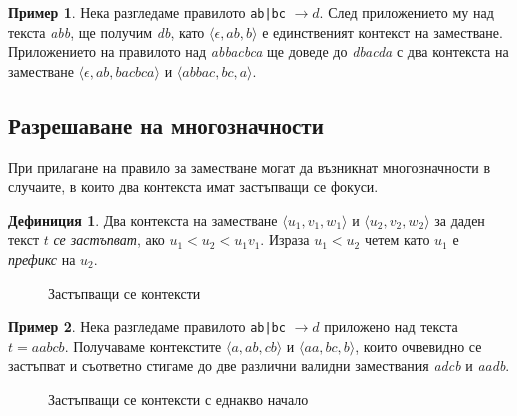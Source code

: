 \documentclass[12pt, oneside]{article}
\theoremstyle{definition}
\newtheorem{definition}{Дефиниция}[section]
\newtheorem{example}{Пример}[section]
\begin{document}
\begin{example}
	Нека разгледаме правилото \verb/ab|bc/ \( \to d \). След приложението му над текста \emph{abb}, ще получим \emph{db}, като \( \langle \epsilon, ab, b \rangle \) е единственият контекст на заместване. Приложението на правилото над \emph{abbacbca} ще доведе до \emph{dbacda} с два контекста на заместване \( \langle \epsilon, ab, bacbca \rangle \) и \( \langle abbac, bc, a \rangle \).
\end{example}

\subsection{Разрешаване на многозначности}

При прилагане на правило за заместване могат да възникнат многозначности в случаите, в които два контекста имат застъпващи се фокуси.

\begin{definition}
	Два контекста на заместване \( \langle u_1,v_1,w_1 \rangle \) и \( \langle u_2,v_2,w_2 \rangle \) за даден текст \( t \) \emph{се застъпват}, ако \( u_1 < u_2 < u_1v_1 \). Израза \( u_1 < u_2 \) четем като \( u_1 \) е \emph{префикс} на \( u_2 \).
\end{definition}

\begin{figure}[!htb]
	\centering
	
	\caption{Застъпващи се контексти}
\end{figure}

\begin{example}
	Нека разгледаме правилото \verb/ab|bc/ \( \to d \) приложено над текста \( t = aabcb \). Получаваме контекстите \( \langle a, ab, cb \rangle \) и \( \langle aa, bc, b \rangle \), които очвевидно се застъпват и съответно стигаме до две различни валидни замествания \emph{adcb} и \emph{aadb}.
\end{example}

\begin{figure}[!htb]
	\centering
	
	\caption{Застъпващи се контексти с еднакво начало}
\end{figure}
\end{document}
